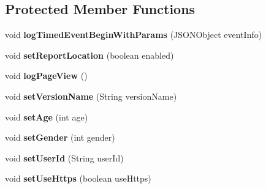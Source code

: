 \subsection*{Protected Member Functions}
\begin{DoxyCompactItemize}
\item 
\mbox{\label{classorg_1_1cocos2dx_1_1plugin_1_1AnalyticsFlurry_a7a1ed5edf66e2591e20d95b1ab9cabef}} 
void {\bfseries log\+Timed\+Event\+Begin\+With\+Params} (J\+S\+O\+N\+Object event\+Info)
\item 
\mbox{\label{classorg_1_1cocos2dx_1_1plugin_1_1AnalyticsFlurry_a6b7ad8a5935148fade727ee4d1aa1a50}} 
void {\bfseries set\+Report\+Location} (boolean enabled)
\item 
\mbox{\label{classorg_1_1cocos2dx_1_1plugin_1_1AnalyticsFlurry_a8f93ab653ecdff43a8530e45afa0eab5}} 
void {\bfseries log\+Page\+View} ()
\item 
\mbox{\label{classorg_1_1cocos2dx_1_1plugin_1_1AnalyticsFlurry_aa5b053737517f742944cd1395f525315}} 
void {\bfseries set\+Version\+Name} (String version\+Name)
\item 
\mbox{\label{classorg_1_1cocos2dx_1_1plugin_1_1AnalyticsFlurry_a5d4fc1510687e2ebd1cdfc08bed2997d}} 
void {\bfseries set\+Age} (int age)
\item 
\mbox{\label{classorg_1_1cocos2dx_1_1plugin_1_1AnalyticsFlurry_a29984b20b8f77e080e0c9725293eb8c7}} 
void {\bfseries set\+Gender} (int gender)
\item 
\mbox{\label{classorg_1_1cocos2dx_1_1plugin_1_1AnalyticsFlurry_ac84fa778831e1412f896032dc37f16a8}} 
void {\bfseries set\+User\+Id} (String user\+Id)
\item 
\mbox{\label{classorg_1_1cocos2dx_1_1plugin_1_1AnalyticsFlurry_ae9b619f602daa724d19f05a3ee64c972}} 
void {\bfseries set\+Use\+Https} (boolean use\+Https)
\end{DoxyCompactItemize}
